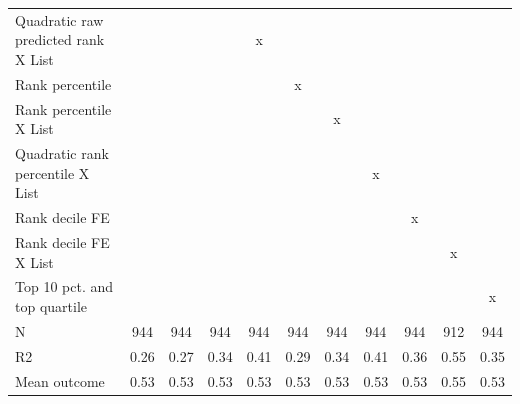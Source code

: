 \begin{tabular}{lcccccccccc}
Quadratic raw predicted rank X List&                     &                     &                     &           x         &                     &                     &                     &                     &                     &                     \\
Rank percentile&                     &                     &                     &                     &           x         &                     &                     &                     &                     &                     \\
Rank percentile X List&                     &                     &                     &                     &                     &           x         &                     &                     &                     &                     \\
Quadratic rank percentile X List&                     &                     &                     &                     &                     &                     &           x         &                     &                     &                     \\
Rank decile FE&                     &                     &                     &                     &                     &                     &                     &           x         &                     &                     \\
Rank decile FE X List&                     &                     &                     &                     &                     &                     &                     &                     &           x         &                     \\
Top 10 pct. and top quartile&                     &                     &                     &                     &                     &                     &                     &                     &                     &           x         \\
N           &         944         &         944         &         944         &         944         &         944         &         944         &         944         &         944         &         912         &         944         \\
R2          &        0.26         &        0.27         &        0.34         &        0.41         &        0.29         &        0.34         &        0.41         &        0.36         &        0.55         &        0.35         \\
Mean outcome&        0.53         &        0.53         &        0.53         &        0.53         &        0.53         &        0.53         &        0.53         &        0.53         &        0.55         &        0.53         \\
\bottomrule \end{tabular}
